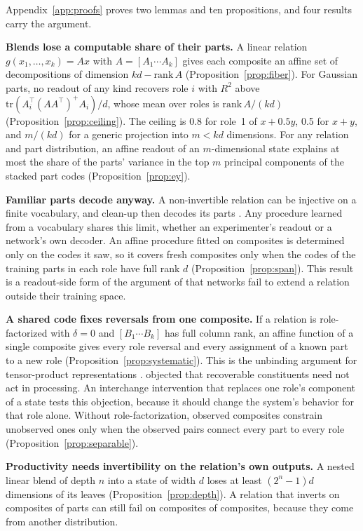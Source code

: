 Appendix~\ref{app:proofs} proves two lemmas and ten propositions, and four results carry the argument.

\textbf{Blends lose a computable share of their parts.} A linear relation $g(x_1, \ldots, x_k) = A x$ with $A = [A_1 \cdots A_k]$ gives each composite an affine set of decompositions of dimension $kd - \mathrm{rank}\,A$ (Proposition~\ref{prop:fiber}). For Gaussian parts, no readout of any kind recovers role $i$ with $R^2$ above $\mathrm{tr}(A_i^{\top}(AA^{\top})^{+}A_i)/d$, whose mean over roles is $\mathrm{rank}\,A/(kd)$ (Proposition~\ref{prop:ceiling}). The ceiling is 0.8 for role~1 of $x + 0.5y$, 0.5 for $x + y$, and $m/(kd)$ for a generic projection into $m < kd$ dimensions. For any relation and part distribution, an affine readout of an $m$-dimensional state explains at most the share of the parts' variance in the top $m$ principal components of the stacked part codes (Proposition~\ref{prop:ey}).

\textbf{Familiar parts decode anyway.} A non-invertible relation can be injective on a finite vocabulary, and clean-up then decodes its parts \citep{plate2003,frady2018}. Any procedure learned from a vocabulary shares this limit, whether an experimenter's readout or a network's own decoder. An affine procedure fitted on composites is determined only on the codes it saw, so it covers fresh composites only when the codes of the training parts in each role have full rank $d$ (Proposition~\ref{prop:span}). This result is a readout-side form of the argument of \citet{marcus1998} that networks fail to extend a relation outside their training space.

\textbf{A shared code fixes reversals from one composite.} If a relation is role-factorized with $\delta = 0$ and $[B_1 \cdots B_k]$ has full column rank, an affine function of a single composite gives every role reversal and every assignment of a known part to a new role (Proposition~\ref{prop:systematic}). This is the unbinding argument for tensor-product representations \citep{smolensky1990}. \citet{fodor1990} objected that recoverable constituents need not act in processing. An interchange intervention that replaces one role's component of a state tests this objection, because it should change the system's behavior for that role alone. Without role-factorization, observed composites constrain unobserved ones only when the observed pairs connect every part to every role (Proposition~\ref{prop:separable}).

\textbf{Productivity needs invertibility on the relation's own outputs.} A nested linear blend of depth $n$ into a state of width $d$ loses at least $(2^n - 1)d$ dimensions of its leaves (Proposition~\ref{prop:depth}). A relation that inverts on composites of parts can still fail on composites of composites, because they come from another distribution.

